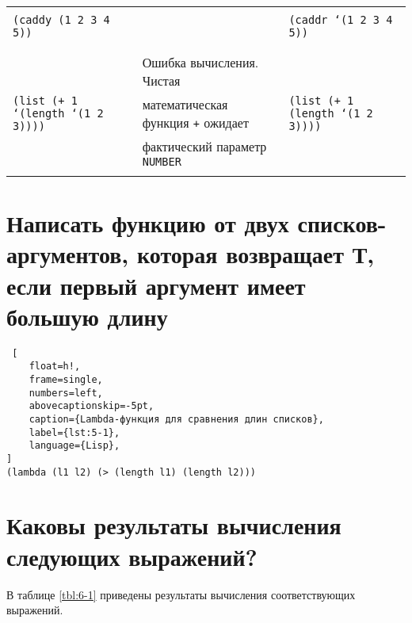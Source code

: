 \begin{landscape}
\begin{table}[!ht]
\begin{center}
\begin{tabular}{|l|l|l|}
            & & \\ 
            \texttt{(caddy (1 2 3 4 5))} & & \texttt{(caddr `(1 2 3 4 5))} \\
            & & \\\hline
            
            & & \\ 
            & Ошибка вычисления. Чистая   & \\
            \texttt{(list (+ 1 `(length `(1 2 3))))} & математическая функция \texttt{+} ожидает  & \texttt{(list (+ 1 (length `(1 2 3))))} \\ 
            & фактический параметр \texttt{NUMBER} & \\
            & & \\\hline
		\end{tabular}
	\end{center}
\end{table}
\end{landscape}

\section{Написать функцию от двух списков-аргументов, которая возвращает Т, если первый аргумент имеет большую длину}

\begin{lstlisting} [
	float=h!,
	frame=single,
	numbers=left,
	abovecaptionskip=-5pt,
	caption={Lambda-функция для сравнения длин списков},
	label={lst:5-1},
	language={Lisp},
]
(lambda (l1 l2) (> (length l1) (length l2)))
\end{lstlisting}

\section{Каковы результаты вычисления следующих выражений?}

В таблице \ref{tbl:6-1} приведены результаты вычисления соответствующих выражений.

